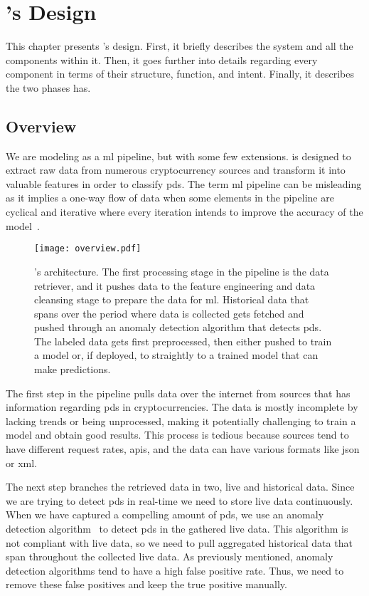 \chapter{\project's Design}\label{ch:design}\glsresetall
This chapter presents \project's design. First, it briefly describes the system and all the components within it. Then, it goes further into details regarding every component in terms of their structure, function, and intent. Finally, it describes the two phases \project has.

\section{Overview}
We are modeling \project as a \ac{ml} pipeline, but with some few extensions. \project is designed to extract raw data from numerous cryptocurrency sources and transform it into valuable features in order to classify \acp{pd}. The term \ac{ml} pipeline can be misleading as it implies a one-way flow of data when some elements in the pipeline are cyclical and iterative where every iteration intends to improve the accuracy of the model~\cite{ml_pipeline_3}. 

\begin{figure}[ht]
    \centering
    \texttt{[image: overview.pdf]}
    \caption[\project's architecture]{\project's architecture. The first processing stage in the pipeline is the data retriever, and it pushes data to the feature engineering and data cleansing stage to prepare the data for \ac{ml}. Historical data that spans over the period where data is collected gets fetched and pushed through an anomaly detection algorithm that detects \acp{pd}. The labeled data gets first preprocessed, then either pushed to train a model or, if deployed, to straightly to a trained model that can make predictions.}
    \label{fig:overview}
\end{figure}

The first step in the pipeline pulls data over the internet from sources that has information regarding \acp{pd} in cryptocurrencies. The data is mostly incomplete by lacking trends or being unprocessed, making it potentially challenging to train a model and obtain good results. This process is tedious because sources tend to have different request rates, \acp{api}, and the data can have various formats like \ac{json} or \ac{xml}.

The next step branches the retrieved data in two, live and historical data. Since we are trying to detect \acp{pd} in real-time we need to store live data continuously. When we have captured a compelling amount of \acp{pd}, we use an anomaly detection algorithm~\cite{P&D_to_the_moon} to detect \acp{pd} in the gathered live data. This algorithm is not compliant with live data, so we need to pull aggregated historical data that span throughout the collected live data. As previously mentioned, anomaly detection algorithms tend to have a high false positive rate. Thus, we need to remove these false positives and keep the true positive manually.

